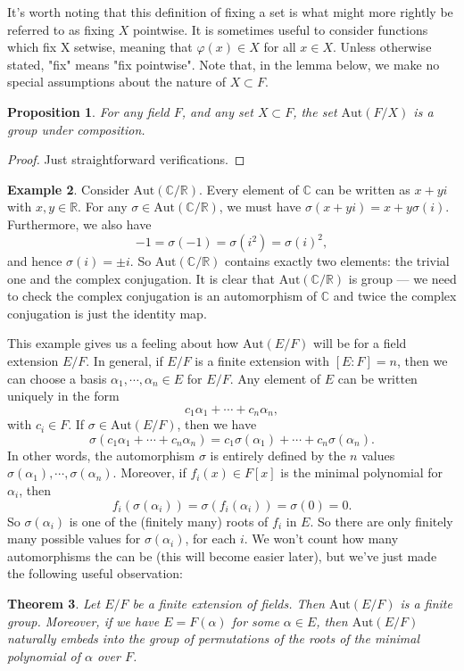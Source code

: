 \documentclass[12pt]{report}
\newtheorem{thm}{Theorem}[section]
\newtheorem{prop}[thm]{Proposition}
{\theoremstyle{remark}\newtheorem*{remark}{Remark}}
\theoremstyle{definition}
\newtheorem{example}[thm]{Example}
\def\CC{\mathbb{C}}
\def\RR{\mathbb{R}}
\def\Aut{\mbox{Aut}}
\def\aa{\alpha}
\begin{document}
It's worth noting that this definition of fixing a set is what might more
rightly be referred to as fixing $X$ pointwise. It is sometimes useful to consider functions which fix X setwise, meaning that $\varphi(x) \in X$ for all $x \in X$. Unless otherwise stated, "fix" means "fix pointwise".
Note that, in the lemma below, we make no special assumptions about
the nature of $X \subset F$.

\begin{prop}
    For any field $F$, and any set $X \subset F$, the set $\Aut(F/X)$ is a group under composition.
\end{prop}

\begin{proof}
    Just straightforward verifications.
\end{proof}

\begin{example}
    Consider $\Aut(\CC/\RR)$. Every element of $\CC$ can be written as $x+yi$ with $x,y\in\RR$. For any $\sigma\in \Aut(\CC/\RR)$, we must have $\sigma(x+yi)=x+y\sigma(i)$. Furthermore, we also have $$-1=\sigma(-1)=\sigma(i^2)=\sigma(i)^2,$$ and hence $\sigma(i)=\pm i$. So $\Aut(\CC/\RR)$ contains exactly two elements: the trivial one and the complex conjugation. It is clear that $\Aut(\CC/\RR)$ is group --- we need to check the complex conjugation is an automorphism of $\CC$ and twice the complex conjugation is just the identity map.
\end{example}

This example gives us a feeling about how $\Aut(E/F)$ will be for a field extension $E/F$. In general, if $E/F$ is a finite extension with $[E:F] = n$, then we can choose a basis $\aa_1,\cdots,\aa_n\in E$ for $E/F$. Any element of $E$ can be written uniquely in the form $$c_1\aa_1+\cdots+c_n\aa_n,$$ with $c_i\in F$. If $\sigma\in\Aut(E/F)$, then we have $$\sigma(c_1\aa_1+\cdots+c_n\aa_n)=c_1\sigma(\aa_1)+\cdots+c_n\sigma(\aa_n).$$  In other words, the automorphism $\sigma$ is entirely defined by the $n$ values $\sigma(\aa_1),\cdots,\sigma(\aa_n)$. Moreover, if $f_i(x) \in F[x]$ is the minimal polynomial for $\aa_i$, then $$f_i(\sigma(\aa_i)) = \sigma(f_i(\aa_i)) = \sigma(0) = 0.$$
So $\sigma(\aa_i)$ is one of the (finitely many) roots of $f_i$ in $E$. So there are only finitely many possible values for $\sigma(\aa_i)$, for each $i$. We won't count how many automorphisms the can be (this will become easier later), but we've just made the following useful observation:

\begin{thm}
    Let $E/F$ be a finite extension of fields. Then $\Aut(E/F)$ is a finite group. Moreover, if we have $E = F(\aa)$ for some $\aa \in E$, then $\Aut(E/F)$ naturally embeds into the group of permutations of the roots of the minimal polynomial of $\aa$ over $F$.
\end{thm}
\end{document}
